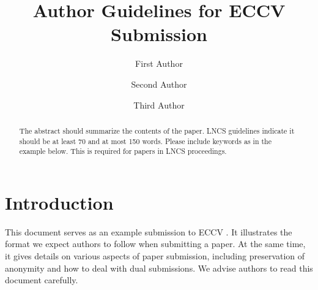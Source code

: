\documentclass[runningheads]{llncs}
\begin{document}
\title{Author Guidelines for ECCV Submission} 


\author{First Author \and
Second Author \and
Third Author}



\maketitle


\begin{abstract}
  The abstract should summarize the contents of the paper. 
  LNCS guidelines indicate it should be at least 70 and at most 150 words.
  Please include keywords as in the example below. 
  This is required for papers in LNCS proceedings.
\end{abstract}


\section{Introduction}
This document serves as an example submission to ECCV \ECCVyear{}.
It illustrates the format we expect authors to follow when submitting a paper. 
At the same time, it gives details on various aspects of paper submission, including preservation of anonymity and how to deal with dual submissions.
We advise authors to read this document carefully.
\end{document}
